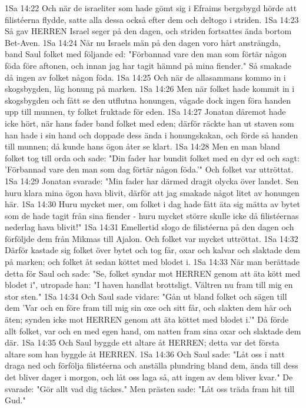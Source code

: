 1Sa 14:22  Och när de israeliter som hade gömt sig i Efraims bergsbygd hörde att filistéerna flydde, satte alla dessa också efter dem och deltogo i striden.
1Sa 14:23  Så gav HERREN Israel seger på den dagen, och striden fortsattes ända bortom Bet-Aven.
1Sa 14:24  När nu Israels män på den dagen voro hårt ansträngda, band Saul folket med följande ed: "Förbannad vare den man som förtär någon föda före aftonen, och innan jag har tagit hämnd på mina fiender." Så smakade då ingen av folket någon föda.
1Sa 14:25  Och när de allasammans kommo in i skogsbygden, låg honung på marken.
1Sa 14:26  Men när folket hade kommit in i skogsbygden och fått se den utflutna honungen, vågade dock ingen föra handen upp till munnen, ty folket fruktade för eden.
1Sa 14:27  Jonatan däremot hade icke hört, när hans fader band folket med eden; därför räckte han ut staven som han hade i sin hand och doppade dess ända i honungskakan, och förde så handen till munnen; då kunde hans ögon åter se klart.
1Sa 14:28  Men en man bland folket tog till orda och sade: "Din fader har bundit folket med en dyr ed och sagt: 'Förbannad vare den man som dag förtär någon föda.'" Och folket var uttröttat.
1Sa 14:29  Jonatan svarade: "Min fader har därmed dragit olycka över landet. Sen huru klara mina ögon hava blivit, därför att jag smakade något litet av honungen här.
1Sa 14:30  Huru mycket mer, om folket i dag hade fått äta sig mätta av bytet som de hade tagit från sina fiender - huru mycket större skulle icke då filistéernas nederlag hava blivit!"
1Sa 14:31  Emellertid slogo de filistéerna på den dagen och förföljde dem från Mikmas till Ajalon. Och folket var mycket uttröttat.
1Sa 14:32  Därför kastade sig folket över bytet och tog får, oxar och kalvar och slaktade dem på marken; och folket åt sedan köttet med blodet i.
1Sa 14:33  När man berättade detta för Saul och sade: "Se, folket syndar mot HERREN genom att äta kött med blodet i", utropade han: "I haven handlat brottsligt. Vältren nu fram till mig en stor sten."
1Sa 14:34  Och Saul sade vidare: "Gån ut bland folket och sägen till dem 'Var och en före fram till mig sin oxe och sitt får, och slakten dem här och äten; synden icke mot HERREN genom att äta köttet med blodet i.'" Då förde allt folket, var och en med egen hand, om natten fram sina oxar och slaktade dem där.
1Sa 14:35  Och Saul byggde ett altare åt HERREN; detta var det första altare som han byggde åt HERREN.
1Sa 14:36  Och Saul sade: "Låt oss i natt draga ned och förfölja filistéerna och anställa plundring bland dem, ända till dess det bliver dager i morgon, och låt oss laga så, att ingen av dem bliver kvar." De svarade: "Gör allt vad dig täckes." Men prästen sade: "Låt oss träda fram hit till Gud."
